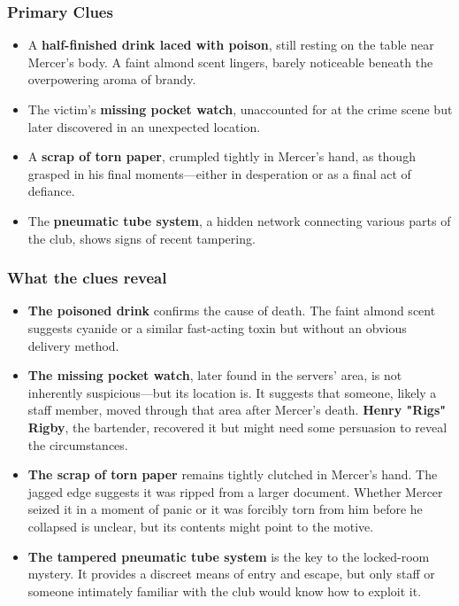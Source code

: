 \begin{WyrdExplanation}{}
	\subsubsection*{Primary Clues}
	\begin{itemize}
		\item A \textbf{half-finished drink laced with poison}, still resting on the table near Mercer’s body. A faint almond scent lingers, barely noticeable beneath the overpowering aroma of brandy.
		\item The victim’s \textbf{missing pocket watch}, unaccounted for at the crime scene but later discovered in an unexpected location.
		\item A \textbf{scrap of torn paper}, crumpled tightly in Mercer’s hand, as though grasped in his final moments—either in desperation or as a final act of defiance.
		\item The \textbf{pneumatic tube system}, a hidden network connecting various parts of the club, shows signs of recent tampering.
	\end{itemize}

	\subsubsection*{What the clues reveal}
	\begin{itemize}
		\item \textbf{The poisoned drink} confirms the cause of death. The faint almond scent suggests cyanide or a similar fast-acting toxin but without an obvious delivery method.
		\item \textbf{The missing pocket watch}, later found in the servers' area, is not inherently suspicious—but its location is. It suggests that someone, likely a staff member, moved through that area after Mercer’s death. \textbf{Henry "Rigs" Rigby}, the bartender, recovered it but might need some persuasion to reveal the circumstances.
		\item \textbf{The scrap of torn paper} remains tightly clutched in Mercer’s hand. The jagged edge suggests it was ripped from a larger document. Whether Mercer seized it in a moment of panic or it was forcibly torn from him before he collapsed is unclear, but its contents might point to the motive.
		\item \textbf{The tampered pneumatic tube system} is the key to the locked-room mystery. It provides a discreet means of entry and escape, but only staff or someone intimately familiar with the club would know how to exploit it.
	\end{itemize}
\end{WyrdExplanation}